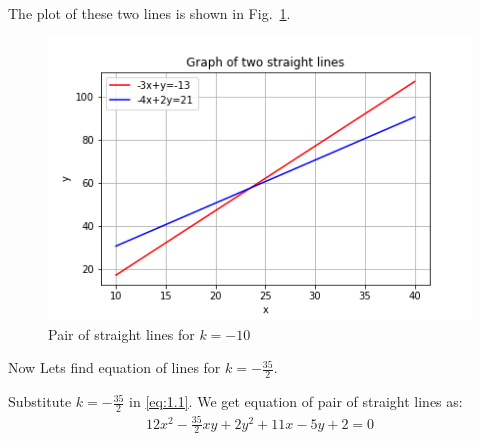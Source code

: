 \documentclass[journal,12pt,twocolumn]{IEEEtran}
\begin{document}
The plot of these two lines is shown in Fig.~\ref{fig:figure1}.
\begin{figure}[ht!]
    \centering
    \includegraphics[width=\columnwidth]{Figure1}
    \caption{Pair of straight lines for $k=-10$}
    \label{fig:figure1}
\end{figure}

Now Lets find equation of lines for $k=-\frac{35}{2}$.

Substitute $k=-\frac{35}{2}$ in \eqref{eq:1.1}. We get equation of pair of straight lines as:
\begin{align}
    12x^2-\frac{35}{2}xy+2y^2+11x-5y+2=0
\end{align}
\end{document}
